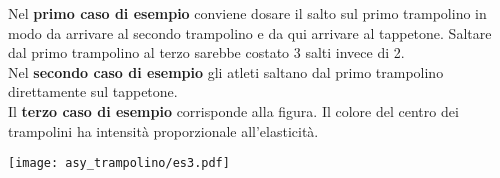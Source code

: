 \Examples
\begin{example}
%
\end{example}
\begin{example}
%
\end{example}
\begin{example}
%
\end{example}


\Explanation
Nel \textbf{primo caso di esempio} conviene dosare il salto sul primo trampolino in modo da arrivare al secondo trampolino e da qui arrivare al tappetone. Saltare dal primo trampolino al terzo sarebbe costato 3 salti invece di 2.\\[2mm]
Nel \textbf{secondo caso di esempio} gli atleti saltano dal primo trampolino direttamente sul tappetone.\\[2mm]
Il \textbf{terzo caso di esempio} corrisponde alla figura. Il colore del centro dei trampolini ha intensità proporzionale all'elasticità.
\begin{center}
	\centering\texttt{[image: asy\_trampolino/es3.pdf]}
\end{center}
